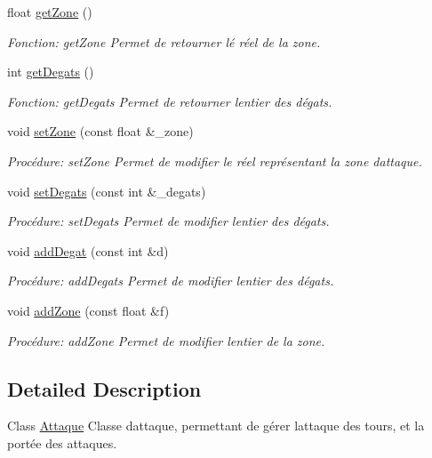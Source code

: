\begin{DoxyCompactItemize}
float \hyperlink{classAttaque_a84b1813598ac33dfcb76652d7ad4ebd4}{get\+Zone} ()
\begin{DoxyCompactList}\small\item\em Fonction\+: get\+Zone Permet de retourner lé réel de la zone. \end{DoxyCompactList}\item 
int \hyperlink{classAttaque_a56856e2880988e4cf9b051d32ca427a3}{get\+Degats} ()
\begin{DoxyCompactList}\small\item\em Fonction\+: get\+Degats Permet de retourner l\textquotesingle{}entier des dégats. \end{DoxyCompactList}\item 
void \hyperlink{classAttaque_ae6dc5afd850f4518e937b8a2c08ac764}{set\+Zone} (const float \&\+\_\+zone)
\begin{DoxyCompactList}\small\item\em Procédure\+: set\+Zone Permet de modifier le réel représentant la zone d\textquotesingle{}attaque. \end{DoxyCompactList}\item 
void \hyperlink{classAttaque_ad1af4e5ae848c40c7879fa4f9a56c674}{set\+Degats} (const int \&\+\_\+degats)
\begin{DoxyCompactList}\small\item\em Procédure\+: set\+Degats Permet de modifier l\textquotesingle{}entier des dégats. \end{DoxyCompactList}\item 
void \hyperlink{classAttaque_a47b0b804d6533953ed18fc8239f2cc1d}{add\+Degat} (const int \&d)
\begin{DoxyCompactList}\small\item\em Procédure\+: add\+Degats Permet de modifier l\textquotesingle{}entier des dégats. \end{DoxyCompactList}\item 
void \hyperlink{classAttaque_a1d4ca211e47b04d97bed004af117b550}{add\+Zone} (const float \&f)
\begin{DoxyCompactList}\small\item\em Procédure\+: add\+Zone Permet de modifier l\textquotesingle{}entier de la zone. \end{DoxyCompactList}\end{DoxyCompactItemize}


\subsection{Detailed Description}
Class \hyperlink{classAttaque}{Attaque} Classe d\textquotesingle{}attaque, permettant de gérer l\textquotesingle{}attaque des tours, et la portée des attaques. 

